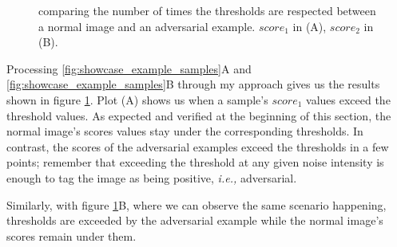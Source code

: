\begin{figure}[htp]
     

    \caption{ comparing the number of times the thresholds are respected between
        a normal image and an adversarial example. $score_1$ in (A), $score_2$ in
        (B).  }
    \label{fig:showcase_scores}
\end{figure}

Processing \ref{fig:showcase_example_samples}A and
\ref{fig:showcase_example_samples}B through my approach gives us the results
shown in figure \ref{fig:showcase_scores}. Plot (A) shows us when a sample's
$score_1$ values exceed the threshold values. As expected and verified at the
beginning of this section, the normal image's scores values stay under the
corresponding thresholds. In contrast, the scores of the adversarial examples
exceed the thresholds in a few points; remember that exceeding the threshold at
any given noise intensity is enough to tag the image as being positive,
\emph{i.e.,} adversarial.

Similarly, with figure \ref{fig:showcase_scores}B, where we can
observe the same scenario happening, thresholds are exceeded by the adversarial
example while the normal image's scores remain under them.
